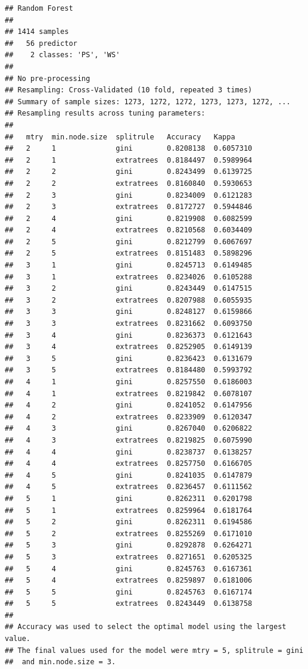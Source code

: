 \documentclass[12pt]{article}
\begin{document}
\begin{verbatim}
## Random Forest 
## 
## 1414 samples
##   56 predictor
##    2 classes: 'PS', 'WS' 
## 
## No pre-processing
## Resampling: Cross-Validated (10 fold, repeated 3 times) 
## Summary of sample sizes: 1273, 1272, 1272, 1273, 1273, 1272, ... 
## Resampling results across tuning parameters:
## 
##   mtry  min.node.size  splitrule   Accuracy   Kappa    
##   2     1              gini        0.8208138  0.6057310
##   2     1              extratrees  0.8184497  0.5989964
##   2     2              gini        0.8243499  0.6139725
##   2     2              extratrees  0.8160840  0.5930653
##   2     3              gini        0.8234009  0.6121283
##   2     3              extratrees  0.8172727  0.5944846
##   2     4              gini        0.8219908  0.6082599
##   2     4              extratrees  0.8210568  0.6034409
##   2     5              gini        0.8212799  0.6067697
##   2     5              extratrees  0.8151483  0.5898296
##   3     1              gini        0.8245713  0.6149485
##   3     1              extratrees  0.8234026  0.6105288
##   3     2              gini        0.8243449  0.6147515
##   3     2              extratrees  0.8207988  0.6055935
##   3     3              gini        0.8248127  0.6159866
##   3     3              extratrees  0.8231662  0.6093750
##   3     4              gini        0.8236373  0.6121643
##   3     4              extratrees  0.8252905  0.6149139
##   3     5              gini        0.8236423  0.6131679
##   3     5              extratrees  0.8184480  0.5993792
##   4     1              gini        0.8257550  0.6186003
##   4     1              extratrees  0.8219842  0.6078107
##   4     2              gini        0.8241052  0.6147956
##   4     2              extratrees  0.8233909  0.6120347
##   4     3              gini        0.8267040  0.6206822
##   4     3              extratrees  0.8219825  0.6075990
##   4     4              gini        0.8238737  0.6138257
##   4     4              extratrees  0.8257750  0.6166705
##   4     5              gini        0.8241035  0.6147879
##   4     5              extratrees  0.8236457  0.6111562
##   5     1              gini        0.8262311  0.6201798
##   5     1              extratrees  0.8259964  0.6181764
##   5     2              gini        0.8262311  0.6194586
##   5     2              extratrees  0.8255269  0.6171010
##   5     3              gini        0.8292878  0.6264271
##   5     3              extratrees  0.8271651  0.6205325
##   5     4              gini        0.8245763  0.6167361
##   5     4              extratrees  0.8259897  0.6181006
##   5     5              gini        0.8245763  0.6167174
##   5     5              extratrees  0.8243449  0.6138758
## 
## Accuracy was used to select the optimal model using the largest value.
## The final values used for the model were mtry = 5, splitrule = gini
##  and min.node.size = 3.
\end{verbatim}
\end{document}
